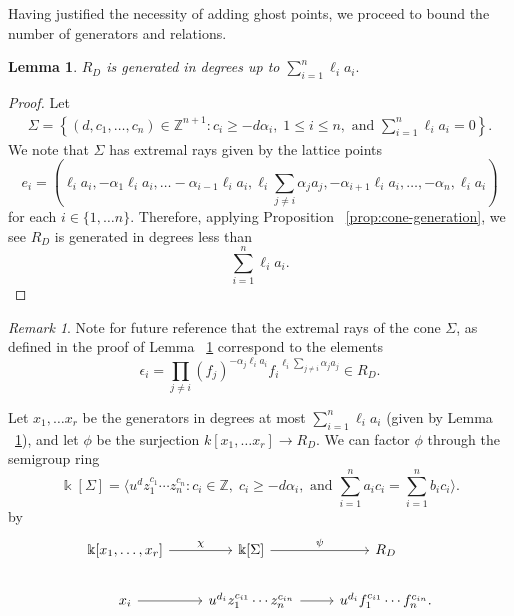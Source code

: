\documentclass{amsart}
\theoremstyle{plain}
\newtheorem{lem}[thm]{Lemma}
\theoremstyle{definition}
\theoremstyle{remark}
\newtheorem{rem}[thm]{Remark}
\numberwithin{equation}{section}
\newcommand\bz{{\mathbb Z}}
\newcommand\bk{{\Bbbk}}
\newcommand\bida{a}
\newcommand\bidb{b}
\begin{document}
Having justified the necessity of adding ghost points, we proceed to bound the
number of generators and relations.

\begin{lem} \label{lem:proj-generators}
$R_D$ is generated in degrees up to $\sum_{i=1}^n \ell_i a_i.$
\end{lem}
\begin{proof}
Let 
\begin{align}\label{eqn:Sigma-def}
	\Sigma = \left \{(d, c_1, \ldots, c_n) \in \bz^{n+1} : c_i \geq - d
\alpha_i, \; 1 \leq i \leq n, \text{ and } \sum_{i=1}^{n} \ell_i \bida_i = 0
\right \}.
\end{align}
We note that $\Sigma$ has extremal rays given by the lattice points 
\begin{equation}\label{defn:e-i-proj}
	e_i = \left(\ell_i \bida_i, - \alpha_1 \ell_i \bida_i, \ldots
-\alpha_{i-1} \ell_i \bida_i, \ell_i \sum_{j\ne i} \alpha_j \bida_j,
-\alpha_{i+1} \ell_i \bida_i, \ldots, -\alpha_n, \ell_i \bida_i \right)
\end{equation}
for each $i\in \{1, \ldots n\}$.
Therefore, applying Proposition ~\ref{prop:cone-generation}, we see $R_D$ is generated in degrees less than
\[
	\sum_{i=1}^n \ell_i a_i.
\]
\end{proof}

\begin{rem}
\label{rem:pm-extremal-rays}
Note for future reference that the extremal rays of the cone $\Sigma$, as
defined in the proof of Lemma ~\ref{lem:proj-generators} correspond to the
elements
\begin{equation}
\label{eqn:epsilon-def-proj}
	\epsilon_i = \prod_{j\ne i} (f_j)^{-\alpha_j \ell_i a_i} {f_i}^{\ell_i \sum_{j\ne i} \alpha_j a_j}\in R_D.
\end{equation}
\end{rem}



Let $x_1, \ldots x_r$ be the generators in degrees at most $\sum_{i=1}^n \ell_i
\bida_i$ (given by Lemma ~\ref{lem:proj-generators}), and let $\phi$ be the
surjection $k[x_1, \ldots x_r] \to R_D$.  We can factor $\phi$ through the
semigroup ring 
\[
	\bk[\Sigma] =  \langle u^d z_1^{c_1} \cdots z_n^{c_n} : c_i \in
\mathbb{Z}, \; c_i \geq -d \alpha_i, \mbox{ and }\sum_{i=1}^{n} \bida_i c_i =
\sum_{i=1}^{n} \bidb_i c_i \rangle. 
\]
by
\[
\begin{tikzcd}
\bk[x_1,\ldots, x_r] \ar {r}{\chi} & \bk[\Sigma] \ar {r}{\psi} & R_D \\
x_i \ar r & u^{d_i}z_1^{c_{i1}} \cdots z_n^{c_{in}} \ar r & u^{d_i}f_1^{c_{i1}} \cdots f_n^{c_{in}}.
\end{tikzcd}
\]
\end{document}
